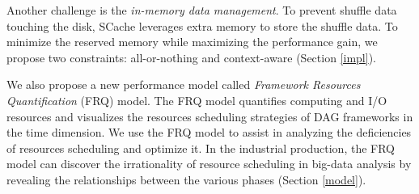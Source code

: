 Another challenge is the \textit{in-memory data management}. 
To prevent shuffle data touching the disk, SCache leverages extra memory to store the shuffle data. 
To minimize the reserved memory while maximizing the performance gain, we propose two constraints: all-or-nothing and context-aware (Section \ref{impl}).

{\color{black}
We also propose a new performance model called \textit{Framework Resources Quantification} (FRQ) model. The FRQ model quantifies computing and I/O resources and visualizes the resources scheduling strategies of DAG frameworks in the time dimension. We use the FRQ model to assist in analyzing the deficiencies of resources scheduling and optimize it. 
In the industrial production, the FRQ model can discover the irrationality of resource scheduling in big-data analysis by revealing the relationships between the various phases (Section \ref{model}).
}

